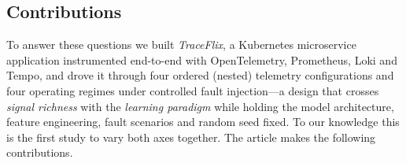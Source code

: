 \documentclass[pdflatex,sn-mathphys-num]{sn-jnl}%
\theoremstyle{thmstyleone}%
\theoremstyle{thmstyletwo}%
\theoremstyle{thmstylethree}%
\begin{document}
\subsection{Contributions}\label{sec:contributions}

To answer these questions we built \emph{TraceFlix}, a Kubernetes microservice application instrumented end-to-end with OpenTelemetry, Prometheus, Loki and Tempo, and drove it through four ordered (nested) telemetry configurations and four operating regimes under controlled fault injection---a design that crosses \emph{signal richness} with the \emph{learning paradigm} while holding the model architecture, feature engineering, fault scenarios and random seed fixed. To our knowledge this is the first study to vary both axes together. The article makes the following contributions.
\end{document}

